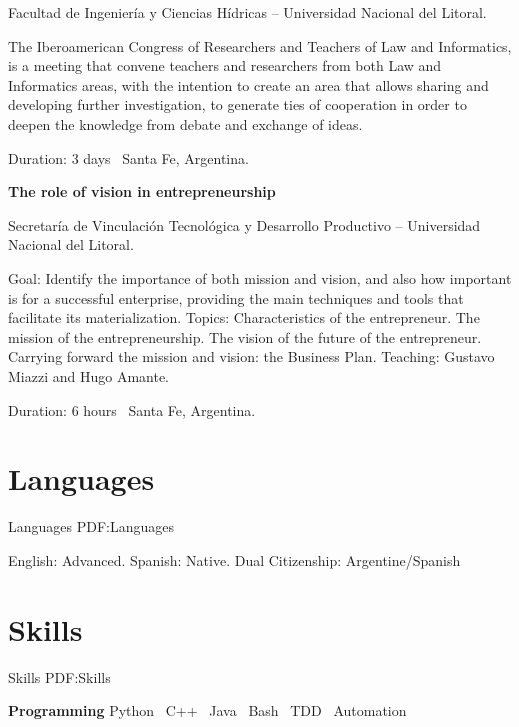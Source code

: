 \documentclass[letterpaper,MMMyyyy,nonstop]{simpleresumecv}
\begin{document}
\begin{body}
\BulletItem Facultad de Ingeniería y Ciencias Hídricas – Universidad Nacional del Litoral.
\begin{detail}
	\SubBulletItem
	The Iberoamerican Congress of Researchers and Teachers of Law and Informatics, is a meeting that convene teachers and researchers from both Law and Informatics areas, with the intention to create an area that allows sharing and developing further investigation, to generate ties of cooperation in order to deepen the knowledge from debate and exchange of ideas.
\end{detail}
Duration: 3 days \SubBulletSymbol\, Santa Fe, Argentina.

\BigGap
\textbf{The role of vision in entrepreneurship}
\hfill
{}

\BulletItem Secretaría de Vinculación Tecnológica y Desarrollo Productivo – Universidad Nacional del Litoral.
\begin{detail}
	\SubBulletItem
	Goal: Identify the importance of both mission and vision, and also how important is for a successful enterprise, providing the main techniques and tools that facilitate its materialization.
	\SubBulletItem
	Topics: Characteristics of the entrepreneur. The mission of the entrepreneurship. The vision of the future of the entrepreneur. Carrying forward the mission and vision: the Business Plan.
	\SubBulletItem
	Teaching: Gustavo Miazzi and Hugo Amante. 
\end{detail}
Duration: 6 hours \SubBulletSymbol\, Santa Fe, Argentina.


\section
{Languages}
{Languages}
{PDF:Languages}

\BulletItem
English: Advanced.
\GapNoBreak
\BulletItem
Spanish: Native.
\GapNoBreak
\BulletItem
Dual Citizenship: Argentine/Spanish


\section
{Skills}
{Skills}
{PDF:Skills}

\textbf{Programming}
\BulletItem Python \SubBulletSymbol\, C++ \SubBulletSymbol\, Java \SubBulletSymbol\, Bash \SubBulletSymbol\, TDD \SubBulletSymbol\, Automation


\end{body}
\end{document}
